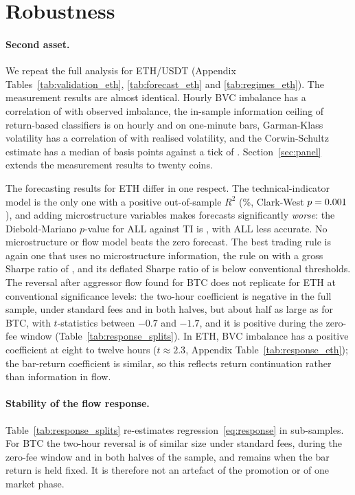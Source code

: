 \section{Robustness}\label{sec:robust}

\paragraph{Second asset.} We repeat the full analysis for ETH/USDT (Appendix
Tables~\ref{tab:validation_eth}, \ref{tab:forecast_eth} and \ref{tab:regimes_eth}). The measurement
results are almost identical. Hourly BVC imbalance has a correlation of \ETHbvcCorr{} with observed
imbalance, the in-sample information ceiling of return-based classifiers is \ETHceilIS{} on hourly and
\ETHceilISm{} on one-minute bars, Garman-Klass volatility has a correlation of \ETHgkCorr{} with
realised volatility, and the Corwin-Schultz estimate has a median of \ETHcsMedian{} basis points
against a tick of \ETHtick. Section~\ref{sec:panel} extends the measurement results to twenty coins.

The forecasting results for ETH differ in one respect. The technical-indicator model is the only one
with a positive out-of-sample $R^2$ (\ETHrtwoTI\%, Clark-West $p=0.001$), and adding
microstructure variables makes forecasts significantly \emph{worse}: the Diebold-Mariano $p$-value
for ALL against TI is \ETHincALLTIDMp, with ALL less accurate. No microstructure or flow model beats
the zero forecast. The best trading rule is again one that uses no microstructure information, the
\ETHbestRule{} rule on \ETHbestModel{} with a gross Sharpe ratio of \ETHbestSR, and its deflated
Sharpe ratio of \ETHbestDSR{} is below conventional thresholds. The
reversal after aggressor flow found for BTC does not replicate for ETH at conventional significance
levels: the two-hour coefficient is negative in the full sample, under standard fees and in both
halves, but about half as large as for BTC, with $t$-statistics between $-0.7$ and $-1.7$, and it is
positive during the zero-fee window (Table~\ref{tab:response_splits}). In ETH, BVC imbalance has a
positive coefficient at eight to twelve hours ($t\approx2.3$, Appendix Table~\ref{tab:response_eth});
the bar-return coefficient is similar, so this reflects return continuation rather than information
in flow.

\paragraph{Stability of the flow response.} Table~\ref{tab:response_splits} re-estimates
regression~\eqref{eq:response} in sub-samples. For BTC the two-hour reversal is of similar size
under standard fees, during the zero-fee window and in both halves of the sample, and remains when
the bar return is held fixed. It is therefore not an artefact of the promotion or of one market
phase.

